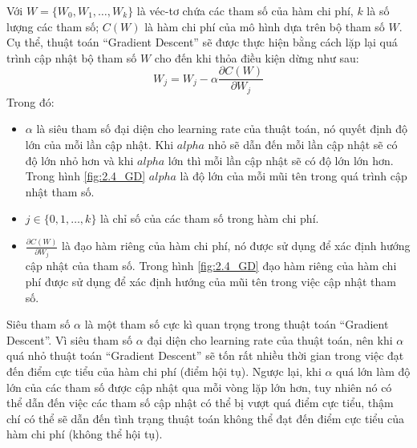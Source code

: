 Với $W = \{W_0, W_1, \dots, W_k\}$ là véc-tơ chứa các tham số của hàm chi phí, $k$ là số lượng các tham số; $C(W)$ là hàm chi phí của mô hình dựa trên bộ tham số $W$. Cụ thể, thuật toán ``Gradient Descent'' sẽ được thực hiện bằng cách lặp lại quá trình cập nhật bộ tham số $W$ cho đến khi thỏa điều kiện dừng như sau:
\begin{equation}
    W_j = W_j - \alpha \frac{\partial C(W)}{\partial W_j}
\end{equation}
Trong đó:
\begin{itemize}
    \item $\alpha$ là siêu tham số đại diện cho learning rate của thuật toán, nó quyết định độ lớn của mỗi lần cập nhật. Khi $alpha$ nhỏ sẽ dẫn đến mỗi lần cập nhật sẽ có độ lớn nhỏ hơn và khi $alpha$ lớn thì mỗi lần cập nhật sẽ có độ lớn lớn hơn. Trong hình \ref{fig:2.4_GD} $alpha$ là độ lớn của mỗi mũi tên trong quá trình cập nhật tham số.
    \item $j \in \{0,1,\dots,k\}$ là chỉ số của các tham số trong hàm chi phí.
    \item $\frac{\partial C(W)}{\partial W_j}$ là đạo hàm riêng của hàm chi phí, nó được sử dụng để xác định hướng cập nhật của tham số. Trong hình \ref{fig:2.4_GD} đạo hàm riêng của hàm chi phí được sử dụng để xác định hướng của mũi tên trong việc cập nhật tham số.
\end{itemize}

Siêu tham số $\alpha$ là một tham số cực kì quan trọng trong thuật toán ``Gradient Descent''. Vì siêu tham số $\alpha$ đại diện cho learning rate của thuật toán, nên khi $\alpha$ quá nhỏ thuật toán ``Gradient Descent'' sẽ tốn rất nhiều thời gian trong việc đạt đến điểm cực tiểu của hàm chi phí (điểm hội tụ). Ngược lại, khi $\alpha$ quá lớn làm độ lớn của các tham số được cập nhật qua mỗi vòng lặp lớn hơn, tuy nhiên nó có thể dẫn đến việc các tham số cập nhật có thể bị vượt quá điểm cực tiểu, thậm chí có thể sẽ dẫn đến tình trạng thuật toán không thể đạt đến điểm cực tiểu của hàm chi phí (không thể hội tụ).